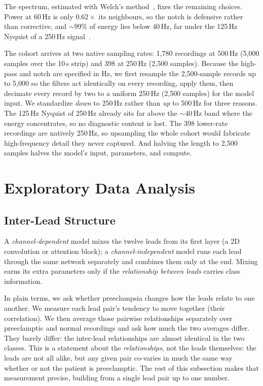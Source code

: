 \documentclass[sigconf,nonacm]{acmart}
\begin{document}
The spectrum, estimated with Welch's method~\cite{welch_use_1967}, fixes the
remaining choices. Power at 60\,Hz is only $0.62\times$ its neighbours, so
the notch is defensive rather than corrective, and $\sim$99\% of energy lies
below 40\,Hz, far under the 125\,Hz Nyquist of a 250\,Hz signal~\cite{shannon_communication_1949}.

The cohort arrives at two native sampling rates: 1{,}780 recordings at
500\,Hz (5{,}000 samples over the 10\,s strip) and 398 at 250\,Hz (2{,}500
samples). Because the high-pass and notch are specified in Hz, we first
resample the 2{,}500-sample records up to 5{,}000 so the filters act
identically on every recording, apply them, then decimate every record by
two to a uniform 250\,Hz (2{,}500 samples) for the model input. We
standardize \emph{down} to 250\,Hz rather than \emph{up} to 500\,Hz for three
reasons. The 125\,Hz Nyquist of 250\,Hz already sits far above the
$\sim$40\,Hz band where the energy concentrates, so no diagnostic content is
lost. The 398 lower-rate recordings are natively 250\,Hz, so upsampling the
whole cohort would fabricate high-frequency detail they never captured. And
halving the length to 2{,}500 samples halves the model's input, parameters,
and compute.

\section{Exploratory Data Analysis}
\label{sec:eda}

\subsection{Inter-Lead Structure}
\label{sec:eda-leads}

A \emph{channel-dependent} model mixes the twelve leads from its first layer
(a 2D convolution or attention block); a \emph{channel-independent} model
runs each lead through the same network separately and combines them only at
the end. Mixing earns its extra parameters only if the \emph{relationship
between leads} carries class information.

In plain terms, we ask whether preeclampsia changes how the leads relate to
one another. We measure each lead pair's tendency to move together (their
correlation). We then average those pairwise relationships separately over
preeclamptic and normal recordings and ask how much the two averages differ.
They barely differ: the inter-lead relationships are almost identical in the
two classes. This is a statement about the \emph{relationships}, not the
leads themselves: the leads are not all alike, but any given pair
co-varies in much the same way whether or not the patient is preeclamptic.
The rest of this subsection makes that measurement precise, building from a
single lead pair up to one number.
\end{document}
